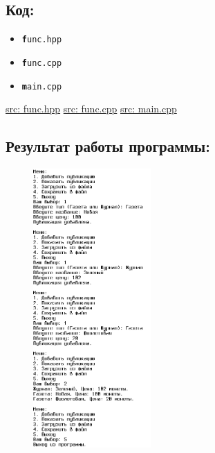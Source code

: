 \documentclass[14pt,a4paper]{article}
\begin{document}
\subsection{Код:}
\begin{itemize}
  \item {\texttt{\textbf func.hpp}}
    
  \item {\texttt{\textbf func.cpp}}
    
  \item {\texttt{\textbf main.cpp}}
    
\end{itemize}
\href{https://raw.githubusercontent.com/John1400800/stuff/refs/heads/main/c_learning/home_works/task20_2/func.hpp}{src: func.hpp}
\href{https://raw.githubusercontent.com/John1400800/stuff/refs/heads/main/c_learning/home_works/task20_2/func.cpp}{src: func.cpp}
\href{https://raw.githubusercontent.com/John1400800/stuff/refs/heads/main/c_learning/home_works/task20_2/main.cpp}{src: main.cpp}
\subsection{Результат работы программы:}
\begin{figure}[H]
  \includegraphics[width=0.4\textwidth]{data/demo16_2.png}
\end{figure}
\end{document}
